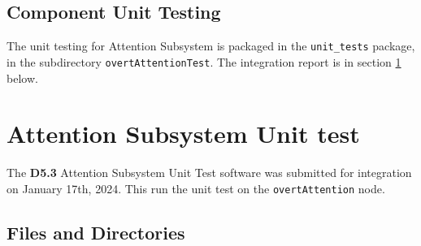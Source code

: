 \documentclass{CSSRforAfrica}
\begin{document}
\subsection{Component Unit Testing}
\label{subsection:overt_attention_unit_testing}

The unit testing for Attention Subsystem is packaged in the {\small \verb+unit_tests+} package, in the subdirectory {\small \verb+overtAttentionTest+}. The integration report is in section \ref{section:overt_attention_test} below.

%  
%  












\newpage
 \section{Attention Subsystem Unit test} 
\label{section:overt_attention_test}
The \textbf{D5.3} Attention Subsystem Unit Test software was submitted for integration on January 17th, 2024. This run the unit test on the {\small \verb+overtAttention+} node.


\subsection{Files and Directories}
\label{subsection:overt_attention_test_files}
 
\end{document}
